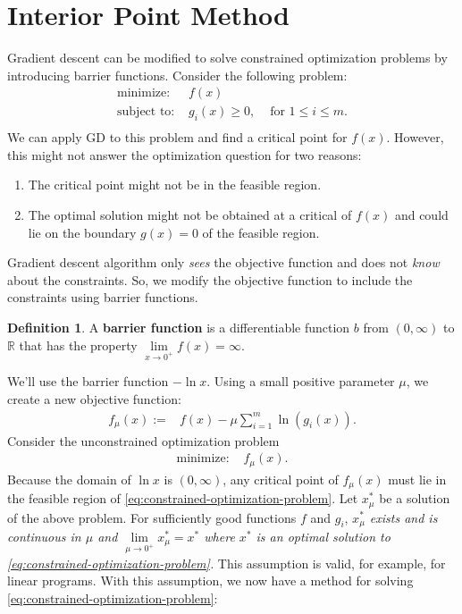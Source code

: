 \documentclass[
]{book}
\providecommand{\tightlist}{%
  \setlength{\itemsep}{0pt}\setlength{\parskip}{0pt}}
\theoremstyle{definition}
\newtheorem{definition}{Definition}[chapter]
\theoremstyle{definition}
\theoremstyle{definition}
\theoremstyle{definition}
\theoremstyle{remark}
\begin{document}
\hypertarget{interior-point-method-1}{%
\section{Interior Point Method}\label{interior-point-method-1}}

Gradient descent can be modified to solve constrained optimization problems by introducing barrier functions.
Consider the following problem:
\begin{equation}
  \begin{array}{llr}
    \mbox{minimize: } & f(x) \\
    \mbox{subject to: } & g_i(x) \ge 0, & \mbox{ for } 1 \le i \le m. \\
  \end{array}
  \label{eq:constrained-optimization-problem}
\end{equation}
We can apply GD to this problem and find a critical point for \(f(x)\). However, this might not answer the optimization question for two reasons:

\begin{enumerate}
\def\labelenumi{\arabic{enumi}.}
\tightlist
\item
  The critical point might not be in the feasible region.
\item
  The optimal solution might not be obtained at a critical of \(f(x)\) and could lie on the boundary \(g(x) = 0\) of the feasible region.
\end{enumerate}

Gradient descent algorithm only \emph{sees} the objective function and does not \emph{know} about the constraints. So, we modify the objective function to include the constraints using barrier functions.

\begin{definition}
A \textbf{barrier function} is a differentiable function \(b\) from \((0, \infty)\) to \(\mathbb{R}\) that has the property \(\lim \limits_{x \to 0^+} f(x) = \infty\).
\end{definition}

We'll use the barrier function \(-\ln x\). Using a small positive parameter \(\mu\), we create a new objective function:
\begin{align*}
  f_\mu(x) := & f(x) - \mu \sum \limits_{i = 1} ^ m \ln (g_i(x)).
\end{align*}
Consider the unconstrained optimization problem
\begin{align*}
  \mbox{minimize: } & f_\mu (x).
\end{align*}
Because the domain of \(\ln x\) is \((0, \infty)\), any critical point of \(f_\mu(x)\) must lie in the feasible region of \eqref{eq:constrained-optimization-problem}.
Let \(x_\mu^*\) be a solution of the above problem.
For sufficiently good functions \(f\) and \(g_i\), \emph{\(x_\mu^*\) exists and is continuous in \(\mu\) and \(\lim \limits_{\mu \to 0^+} x_\mu^* = x^*\) where \(x^*\) is an optimal solution to \eqref{eq:constrained-optimization-problem}.} This assumption is valid, for example, for linear programs. With this assumption, we now have a method for solving \eqref{eq:constrained-optimization-problem}:
\end{document}
